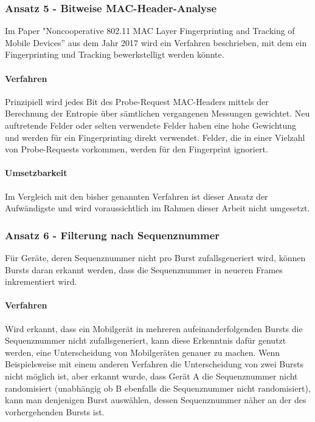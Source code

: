 \subsubsection*{Ansatz 5 - Bitweise MAC-Header-Analyse}
Im Paper "Noncooperative 802.11 MAC Layer Fingerprinting and Tracking 
of Mobile Devices” aus dem Jahr 2017 wird ein Verfahren beschrieben, 
mit dem ein Fingerprinting und Tracking bewerkstelligt werden könnte.

\paragraph{Verfahren}
Prinzipiell wird jedes Bit des Probe-Request MAC-Headers mittels der 
Berechnung der Entropie über sämtlichen vergangenen Messungen gewichtet. 
Neu auftretende Felder oder selten verwendete Felder haben eine hohe Gewichtung 
und werden für ein Fingerprinting direkt verwendet. 
Felder, die in einer Vielzahl von Probe-Requests vorkommen, 
werden für den Fingerprint ignoriert.

\paragraph{Umsetzbarkeit}
Im Vergleich mit den bisher genannten Verfahren ist dieser Ansatz der 
Aufwändigste und wird voraussichtlich im Rahmen dieser Arbeit nicht umgesetzt.

\subsubsection*{Ansatz 6 - Filterung nach Sequenznummer}
Für Geräte, deren Sequenznummer nicht pro Burst zufallsgeneriert wird,
können Bursts daran erkannt werden, dass die Sequenznummer in neueren 
Frames inkrementiert wird.

\paragraph{Verfahren}
Wird erkannt, dass ein Mobilgerät in mehreren aufeinanderfolgenden 
Bursts die Sequenznummer nicht zufallsgeneriert, 
kann diese Erkenntnis dafür genutzt werden, 
eine Unterscheidung von Mobilgeräten genauer zu machen.
Wenn Beispielsweise mit einem anderen Verfahren die Unterscheidung 
von zwei Bursts nicht möglich ist, aber erkannt wurde, 
dass Gerät A die Sequenznummer nicht randomisiert 
(unabhängig ob B ebenfalls die Sequenznummer nicht randomisiert), 
kann man denjenigen Burst auswählen, dessen Sequenznummer näher an der des 
vorhergehenden Bursts ist.

